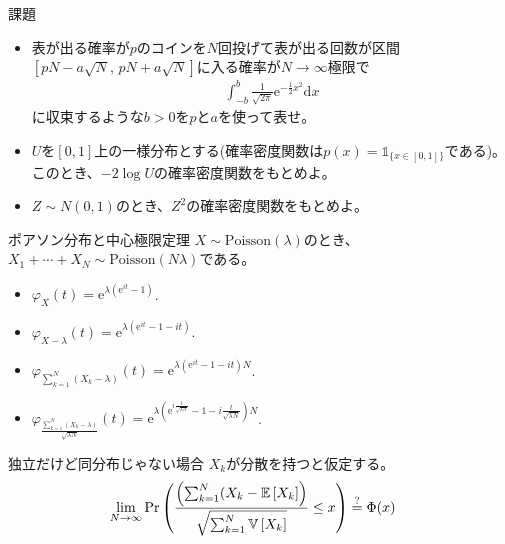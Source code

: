\documentclass[lualatex,handout]{beamer}
\newcommand{\expt}[1]{\mathbb{E}\left[#1\right]}
\newcommand{\var}[1]{\mathbb{V}\left[#1\right]}
\theoremstyle{definition}
\begin{document}
\begin{frame}{課題}
\begin{itemize}
\setlength{\itemsep}{2em}
\item 表が出る確率が$p$のコインを$N$回投げて表が出る回数が区間$\left[pN-a\sqrt{N},\, pN+a\sqrt{N}\right]$に入る確率が$N\to\infty$極限で
\begin{align*}
\int_{-b}^b\frac1{\sqrt{2\pi}} \mathrm{e}^{-\frac12 x^2}\mathrm{d}x
\end{align*}
に収束するような$b>0$を$p$と$a$を使って表せ。
\item $U$を$[0,1]$上の一様分布とする(確率密度関数は$p(x) = \mathbb{1}_{\{x\in[0,1]\}}$である)。
このとき、$-2\log U$の確率密度関数をもとめよ。
\item $Z\sim N(0, 1)$のとき、$Z^2$の確率密度関数をもとめよ。
\end{itemize}
\end{frame}

\begin{frame}{ポアソン分布と中心極限定理}
$X\sim\mathrm{Poisson}(\lambda)$のとき、
$X_1+\dotsb+X_N\sim\mathrm{Poisson}(N\lambda)$である。
\begin{itemize}
\item $\varphi_X(t) = \mathrm{e}^{\lambda(\mathrm{e}^{it}-1)}$.
\item $\varphi_{X-\lambda}(t) = \mathrm{e}^{\lambda(\mathrm{e}^{it}-1-it)}$.
\item $\varphi_{\sum_{k=1}^N(X_k-\lambda)}(t) = \mathrm{e}^{\lambda(\mathrm{e}^{it}-1-it)N}$.
\item $\varphi_{\frac{\sum_{k=1}^N(X_k-\lambda)}{\sqrt{\lambda N}}}(t) = \mathrm{e}^{\lambda\left(\mathrm{e}^{i\frac{t}{\sqrt{\lambda N}}}-1-i\frac{t}{\sqrt{\lambda N}}\right)N}$.
\end{itemize}
\end{frame}
\fi

\begin{frame}{独立だけど同分布じゃない場合}
$X_k$が分散を持つと仮定する。
\begin{align*}
\lim_{N\to\infty}\Pr\left(\frac{\left(\sum_{k=1}^N (X_k-\expt{X_k}\right)}{\sqrt{\sum_{k=1}^N\var{X_k}}} \le x\right) &\stackrel{\large ?}{=} \Phi(x)
\end{align*}
\end{frame}
\fi
\end{document}
